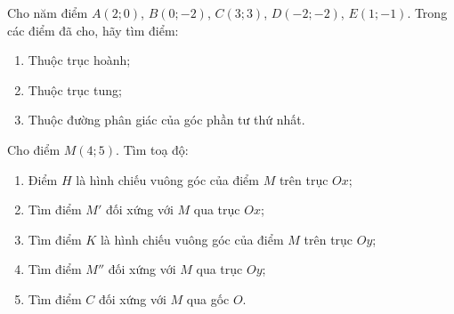 \begin{bt}%
	Cho năm điểm $A(2;0)$, $B(0;-2)$, $C(3;3)$, $D(-2;-2)$, $E(1;-1)$. Trong các điểm đã cho, hãy tìm điểm:
	\begin{enumerate}
		\item Thuộc trục hoành;
		\item Thuộc trục tung;
		\item Thuộc đường phân giác của góc phần tư thứ nhất.
	\end{enumerate}
\end{bt}

\begin{bt}%
	Cho điểm $M(4;5)$. Tìm toạ độ:
	\begin{enumerate}
		\item Điểm $H$ là hình chiếu vuông góc của điểm $M$ trên trục $Ox$;
		\item Tìm điểm $M'$ đối xứng với $M$ qua trục $Ox$;
		\item Tìm điểm $K$ là hình chiếu vuông góc của điểm $M$ trên trục $Oy$;
		\item Tìm điểm $M''$ đối xứng với $M$ qua trục $Oy$;
		\item Tìm điểm $C$ đối xứng với $M$ qua gốc $O$.
	\end{enumerate}
\end{bt}

